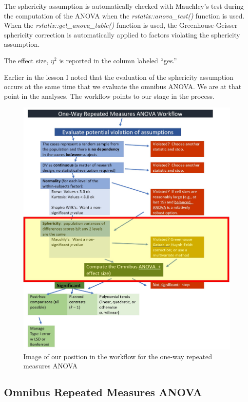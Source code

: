 \documentclass[
  11pt,
]{book}
\begin{document}
The sphericity assumption is automatically checked with Mauchley's test during the computation of the ANOVA when the \emph{rstatix::anova\_test()} function is used. When the \emph{rstatix::get\_anova\_table()} function is used, the Greenhouse-Geisser sphericity correction is automatically applied to factors violating the sphericity assumption.

The effect size, \(\eta^2\) is reported in the column labeled ``ges.''

Earlier in the lesson I noted that the evaluation of the sphericity assumption occurs at the same time that we evaluate the omnibus ANOVA. We are at that point in the analyses. The workflow points to our stage in the process.

\begin{figure}
\centering
\includegraphics{images/oneway_repeated/wf_rptd_omnibus.jpg}
\caption{Image of our position in the workflow for the one-way repeated measures ANOVA}
\end{figure}

\hypertarget{omnibus-repeated-measures-anova}{%
\subsection{Omnibus Repeated Measures ANOVA}\label{omnibus-repeated-measures-anova}}
\end{document}
